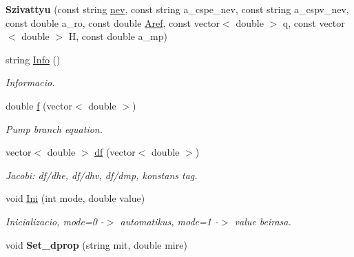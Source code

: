 \begin{DoxyCompactItemize}
\item 
{\bfseries Szivattyu} (const string \hyperlink{class_agelem_abe92b7e3912367d5d1caf6b277ca0b7d}{nev}, const string a\+\_\+cspe\+\_\+nev, const string a\+\_\+cspv\+\_\+nev, const double a\+\_\+ro, const double \hyperlink{class_agelem_a3f8668febc2958fd539997d537552f17}{Aref}, const vector$<$ double $>$ q, const vector$<$ double $>$ H, const double a\+\_\+mp)\hypertarget{class_szivattyu_aea7d1a77b34e471145a856483915369f}{}\label{class_szivattyu_aea7d1a77b34e471145a856483915369f}

\item 
string \hyperlink{class_szivattyu_a369c5e45b9381265feeba29d06bd1e59}{Info} ()\hypertarget{class_szivattyu_a369c5e45b9381265feeba29d06bd1e59}{}\label{class_szivattyu_a369c5e45b9381265feeba29d06bd1e59}

\begin{DoxyCompactList}\small\item\em Informacio. \end{DoxyCompactList}\item 
double \hyperlink{class_szivattyu_a083379e0cee2db17f1b20db3fdfcde79}{f} (vector$<$ double $>$)
\begin{DoxyCompactList}\small\item\em Pump branch equation. \end{DoxyCompactList}\item 
vector$<$ double $>$ \hyperlink{class_szivattyu_aefd62e0f02d12273d34511e4b8721f04}{df} (vector$<$ double $>$)\hypertarget{class_szivattyu_aefd62e0f02d12273d34511e4b8721f04}{}\label{class_szivattyu_aefd62e0f02d12273d34511e4b8721f04}

\begin{DoxyCompactList}\small\item\em Jacobi\+: df/dhe, df/dhv, df/dmp, konstans tag. \end{DoxyCompactList}\item 
void \hyperlink{class_szivattyu_a3c35ef43a38a45e9d077281a8804abe4}{Ini} (int mode, double value)\hypertarget{class_szivattyu_a3c35ef43a38a45e9d077281a8804abe4}{}\label{class_szivattyu_a3c35ef43a38a45e9d077281a8804abe4}

\begin{DoxyCompactList}\small\item\em Inicializacio, mode=0 -\/$>$ automatikus, mode=1 -\/$>$ value beirasa. \end{DoxyCompactList}\item 
void {\bfseries Set\+\_\+dprop} (string mit, double mire)\hypertarget{class_szivattyu_aae9b66e4fc0313360d1b8a65ba0a2a68}{}\label{class_szivattyu_aae9b66e4fc0313360d1b8a65ba0a2a68}


\end{DoxyCompactItemize}
